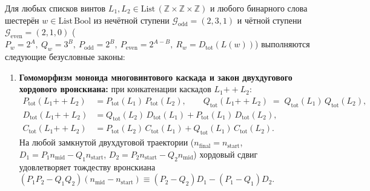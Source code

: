 \begin{theorem}
\label{thm:math-multiscrew-cascade-extremal-envelope}
\leanok
Для любых списков винтов $L_1, L_2 \in \mathrm{List}\,(\mathbb{Z}\times\mathbb{Z}\times\mathbb{Z})$ и любого бинарного слова шестерён $w \in \mathrm{List}\,\mathrm{Bool}$ из нечётной ступени $\mathcal{G}_{\mathrm{odd}} = (2, 3, 1)$ и чётной ступени $\mathcal{G}_{\mathrm{even}} = (2, 1, 0)$ ($P_w = 2^A,\ Q_w = 3^B,\ P_{\mathrm{odd}} = 2^B,\ P_{\mathrm{even}} = 2^{A-B},\ R_w = D_{\mathrm{tot}}(L(w))$) выполняются следующие безусловные законы:
\begin{enumerate}[label=\textbf{(\arabic*)},leftmargin=*]
\item \textbf{Гомоморфизм моноида многовинтового каскада и закон двухдугового хордового вронскиана:}
  при конкатенации каскадов $L_1 \mathbin{+\!+} L_2$:
  \begin{align}
    P_{\mathrm{tot}}(L_1 \mathbin{+\!+} L_2) &= P_{\mathrm{tot}}(L_1)\,P_{\mathrm{tot}}(L_2), \qquad
    Q_{\mathrm{tot}}(L_1 \mathbin{+\!+} L_2) \;=\; Q_{\mathrm{tot}}(L_1)\,Q_{\mathrm{tot}}(L_2), \label{eq:math-multiscrew-pq-hom} \\
    D_{\mathrm{tot}}(L_1 \mathbin{+\!+} L_2) &= Q_{\mathrm{tot}}(L_2)\,D_{\mathrm{tot}}(L_1) + P_{\mathrm{tot}}(L_1)\,D_{\mathrm{tot}}(L_2), \label{eq:math-multiscrew-d-hom} \\
    C_{\mathrm{tot}}(L_1 \mathbin{+\!+} L_2) &= P_{\mathrm{tot}}(L_2)\,C_{\mathrm{tot}}(L_1) + Q_{\mathrm{tot}}(L_1)\,C_{\mathrm{tot}}(L_2). \label{eq:math-multiscrew-c-hom}
  \end{align}
  На любой замкнутой двухдуговой траектории ($n_{\mathrm{final}} = n_{\mathrm{start}}$, $D_1 = P_1 n_{\mathrm{mid}} - Q_1 n_{\mathrm{start}}$, $D_2 = P_2 n_{\mathrm{start}} - Q_2 n_{\mathrm{mid}}$) хордовый сдвиг удовлетворяет тождеству вронскиана $(P_1 P_2 - Q_1 Q_2)(n_{\mathrm{mid}} - n_{\mathrm{start}}) \equiv (P_2 - Q_2)D_1 - (P_1 - Q_1)D_2$.

\end{enumerate}
\end{theorem}
